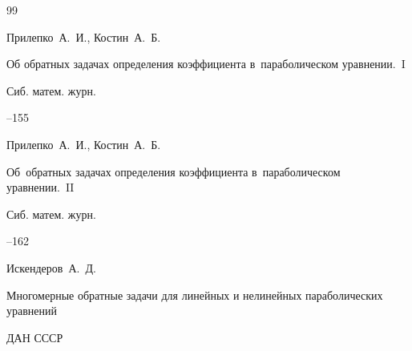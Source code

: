 \begin{thebibliography}{99}






\by Прилепко~А.~И., Костин~А.~Б.

\paper Об обратных задачах определения коэффициента в~параболическом уравнении.~I

\jour Сиб. матем. журн.




--155







\by Прилепко~А.~И., Костин~А.~Б.

\paper Об~обратных задачах определения коэффициента в~параболическом уравнении.~II

\jour Сиб. матем. журн.




--162















\by Искендеров~А.~Д. 

\paper Многомерные обратные задачи для линейных и нелинейных параболических уравнений

\jour ДАН СССР


\end{thebibliography}
